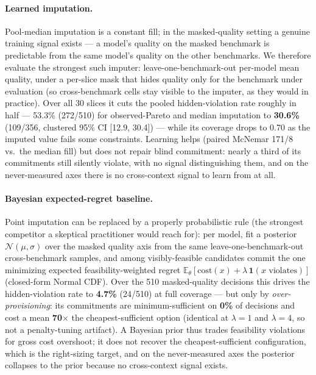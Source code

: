 \documentclass{article} %
\begin{document}
\paragraph{Learned imputation.}
Pool-median imputation is a constant fill; in the masked-quality setting a genuine training signal exists --- a model's quality on the masked benchmark is predictable from the same model's quality on the other benchmarks. We therefore evaluate the strongest such imputer: leave-one-benchmark-out per-model mean quality, under a per-slice mask that hides quality only for the benchmark under evaluation (so cross-benchmark cells stay visible to the imputer, as they would in practice). Over all 30 slices it cuts the pooled hidden-violation rate roughly in half --- 53.3\% (272/510) for observed-Pareto and median imputation to \textbf{30.6\%} (109/356, clustered 95\% CI [12.9, 30.4]) --- while its coverage drops to 0.70 as the imputed value fails some constraints. Learning helps (paired McNemar 171/8 vs.\ the median fill) but does not repair blind commitment: nearly a third of its commitments still silently violate, with no signal distinguishing them, and on the never-measured axes there is no cross-context signal to learn from at all.

\paragraph{Bayesian expected-regret baseline.}
Point imputation can be replaced by a properly probabilistic rule (the strongest competitor a skeptical practitioner would reach for): per model, fit a posterior $\mathcal{N}(\mu,\sigma)$ over the masked quality axis from the same leave-one-benchmark-out cross-benchmark samples, and among visibly-feasible candidates commit the one minimizing expected feasibility-weighted regret $\mathbb{E}_\theta[\mathrm{cost}(x) + \lambda\,\mathbf{1}(x\text{ violates})]$ (closed-form Normal CDF). Over the 510 masked-quality decisions this drives the hidden-violation rate to \textbf{4.7\%} (24/510) at full coverage --- but only by \emph{over-provisioning}: its commitments are minimum-sufficient on \textbf{0\%} of decisions and cost a mean \textbf{70$\times$} the cheapest-sufficient option (identical at $\lambda{=}1$ and $\lambda{=}4$, so not a penalty-tuning artifact). A Bayesian prior thus trades feasibility violations for gross cost overshoot; it does not recover the cheapest-sufficient configuration, which is the right-sizing target, and on the never-measured axes the posterior collapses to the prior because no cross-context signal exists.
\end{document}
